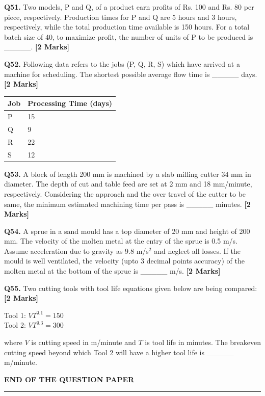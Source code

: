 \documentclass[11pt]{article}
\newcommand{\questionb}[2]{
    \noindent\textbf{Q#2.} #1 \hfill \textbf{[2 Marks]}
}
\begin{document}
\questionb{Two models, P and Q, of a product earn profits of Rs. 100 and Rs. 80 per piece, respectively. Production times for P and Q are 5 hours and 3 hours, respectively, while the total production time available is 150 hours. For a total batch size of 40, to maximize profit, the number of units of P to be produced is \_\_\_\_\_.}{51}
\vspace{0.5cm}

\questionb{Following data refers to the jobs (P, Q, R, S) which have arrived at a machine for scheduling. The shortest possible average flow time is \_\_\_\_\_ days.}{52}
\begin{center}
\begin{tabular}{|l|l|}
\hline
Job & Processing Time (days) \\
\hline
P & 15 \\
Q & 9 \\
R & 22 \\
S & 12 \\
\hline
\end{tabular}
\end{center}
\vspace{0.5cm}

\questionb{A block of length 200 mm is machined by a slab milling cutter 34 mm in diameter. The depth of cut and table feed are set at 2 mm and 18 mm/minute, respectively. Considering the approach and the over travel of the cutter to be same, the minimum estimated machining time per pass is \_\_\_\_\_ minutes.}{53}
\vspace{0.5cm}

\questionb{A sprue in a sand mould has a top diameter of 20 mm and height of 200 mm. The velocity of the molten metal at the entry of the sprue is 0.5 m/s. Assume acceleration due to gravity as 9.8 m/s\(^2\) and neglect all losses. If the mould is well ventilated, the velocity (upto 3 decimal points accuracy) of the molten metal at the bottom of the sprue is \_\_\_\_\_ m/s.}{54}
\vspace{0.5cm}

\questionb{Two cutting tools with tool life equations given below are being compared:}{55}
\begin{center}
Tool 1: \( VT^{0.1} = 150 \) \\
Tool 2: \( VT^{0.3} = 300 \)
\end{center}
where \( V \) is cutting speed in m/minute and \( T \) is tool life in minutes. The breakeven cutting speed beyond which Tool 2 will have a higher tool life is \_\_\_\_\_ m/minute.
\vspace{0.5cm}

\vspace{5cm}
\begin{center}
\textbf{END OF THE QUESTION PAPER} \\
\rule{\textwidth}{0.5pt}
\end{center}
\end{document}
